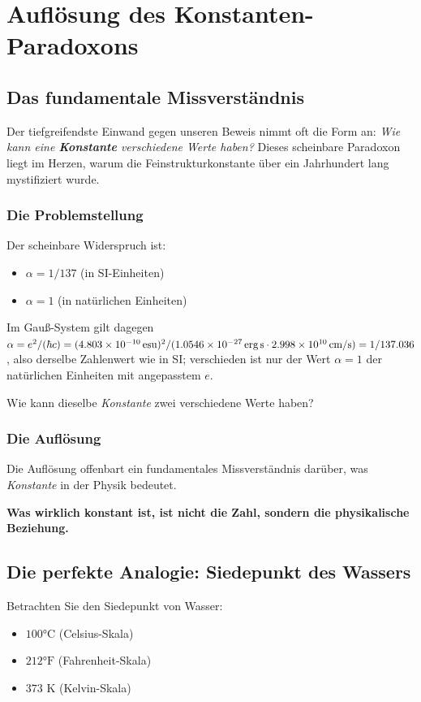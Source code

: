 	\section{Auflösung des Konstanten-Paradoxons}
	
	\subsection{Das fundamentale Missverständnis}
	
	Der tiefgreifendste Einwand gegen unseren Beweis nimmt oft die Form an: \textit{Wie kann eine \textbf{Konstante} verschiedene Werte haben?} Dieses scheinbare Paradoxon liegt im Herzen, warum die Feinstrukturkonstante über ein Jahrhundert lang mystifiziert wurde.
	
	\subsubsection{Die Problemstellung}
	
	Der scheinbare Widerspruch ist:
	\begin{itemize}
		\item $\alpha = 1/137$ (in SI-Einheiten)
		\item $\alpha = 1$ (in natürlichen Einheiten)
	\end{itemize}
	Im Gauß-System gilt dagegen $\alpha=e^2/(\hbar c)=(4.803\times10^{-10}\,\text{esu})^2/(1.0546\times10^{-27}\,\text{erg\,s}\cdot2.998\times10^{10}\,\text{cm/s})=1/137.036$, also derselbe Zahlenwert wie in SI; verschieden ist nur der Wert $\alpha=1$ der natürlichen Einheiten mit angepasstem $e$.
	
	Wie kann dieselbe \textit{Konstante} zwei verschiedene Werte haben?
	
	\subsubsection{Die Auflösung}
	
	Die Auflösung offenbart ein fundamentales Missverständnis darüber, was \textit{Konstante} in der Physik bedeutet.
	
	\textbf{Was wirklich konstant ist, ist nicht die Zahl, sondern die physikalische Beziehung.}
	
	\subsection{Die perfekte Analogie: Siedepunkt des Wassers}
	
	Betrachten Sie den Siedepunkt von Wasser:
	\begin{itemize}
		\item $100°\text{C}$ (Celsius-Skala)
		\item $212°\text{F}$ (Fahrenheit-Skala)
		\item $373\text{ K}$ (Kelvin-Skala)
	\end{itemize}
	
